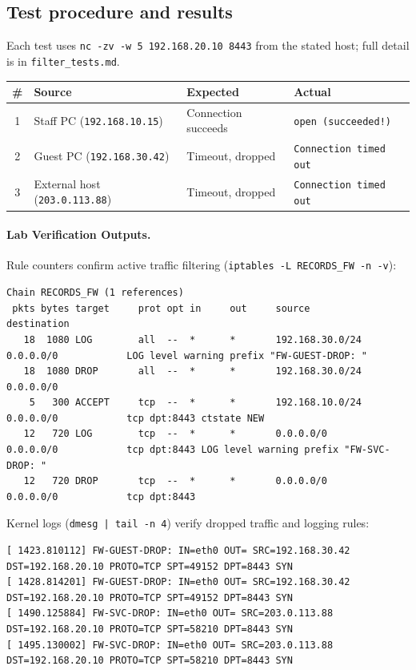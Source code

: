 \documentclass[11pt,a4paper]{article}
\begin{document}
\subsection{Test procedure and results}
Each test uses \texttt{nc -zv -w 5 192.168.20.10 8443} from the stated host; full detail is in \texttt{filter\_tests.md}.

\begin{table}[h!]
\small
\centering
\begin{tabularx}{\textwidth}{@{}c l X l@{}}
\toprule
\# & Source & Expected & Actual \\
\midrule
1 & Staff PC (\texttt{192.168.10.15}) & Connection succeeds & \texttt{open (succeeded!)} \\
2 & Guest PC (\texttt{192.168.30.42}) & Timeout, dropped & \texttt{Connection timed out} \\
3 & External host (\texttt{203.0.113.88}) & Timeout, dropped & \texttt{Connection timed out} \\
\bottomrule
\end{tabularx}
\end{table}

\paragraph{Lab Verification Outputs.}
Rule counters confirm active traffic filtering (\texttt{iptables -L RECORDS\_FW -n -v}):
\begin{lstlisting}
Chain RECORDS_FW (1 references)
 pkts bytes target     prot opt in     out     source               destination         
   18  1080 LOG        all  --  *      *       192.168.30.0/24      0.0.0.0/0            LOG level warning prefix "FW-GUEST-DROP: "
   18  1080 DROP       all  --  *      *       192.168.30.0/24      0.0.0.0/0           
    5   300 ACCEPT     tcp  --  *      *       192.168.10.0/24      0.0.0.0/0            tcp dpt:8443 ctstate NEW
   12   720 LOG        tcp  --  *      *       0.0.0.0/0            0.0.0.0/0            tcp dpt:8443 LOG level warning prefix "FW-SVC-DROP: "
   12   720 DROP       tcp  --  *      *       0.0.0.0/0            0.0.0.0/0            tcp dpt:8443
\end{lstlisting}

Kernel logs (\texttt{dmesg | tail -n 4}) verify dropped traffic and logging rules:
\begin{lstlisting}
[ 1423.810112] FW-GUEST-DROP: IN=eth0 OUT= SRC=192.168.30.42 DST=192.168.20.10 PROTO=TCP SPT=49152 DPT=8443 SYN
[ 1428.814201] FW-GUEST-DROP: IN=eth0 OUT= SRC=192.168.30.42 DST=192.168.20.10 PROTO=TCP SPT=49152 DPT=8443 SYN
[ 1490.125884] FW-SVC-DROP: IN=eth0 OUT= SRC=203.0.113.88 DST=192.168.20.10 PROTO=TCP SPT=58210 DPT=8443 SYN
[ 1495.130002] FW-SVC-DROP: IN=eth0 OUT= SRC=203.0.113.88 DST=192.168.20.10 PROTO=TCP SPT=58210 DPT=8443 SYN
\end{lstlisting}
\end{document}

